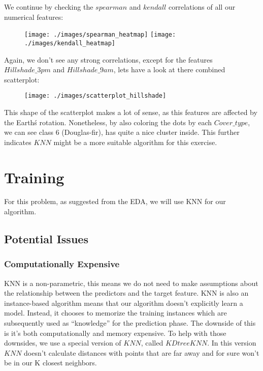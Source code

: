 \documentclass[11pt]{article}
\begin{document}
    We continue by checking the $spearman$ and $kendall$ correlations of all our numerical features:
    \begin{figure}[H]
        \texttt{[image: ./images/spearman\_heatmap]}
        \texttt{[image: ./images/kendall\_heatmap]}
    \end{figure}

    Again, we don't see any strong correlations, except for the features $Hillshade\_3pm$ and $Hillshade\_9am$, lets have a look at there combined scatterplot:
    \begin{figure}[H]
        \centering
        \texttt{[image: ./images/scatterplot\_hillshade]}
    \end{figure}

    This shape of the scatterplot makes a lot of sense, as this features are affected by the Earth\'s rotation.
    Nonetheless, by also coloring the dots by each $Cover\_type$, we can see class 6 (Douglas-fir), has quite a nice cluster inside. This further indicates $KNN$ might be a more suitable algorithm for this exercise.

    \newpage
    \section*{Training}
    For this problem, as suggested from the EDA, we will use KNN for our algorithm.

    \subsection*{Potential Issues}

    \subsubsection*{Computationally Expensive}
    KNN is a non-parametric, this means we do not need to make assumptions about the relationship between the predictors and the target feature.
    KNN is also an instance-based algorithm means that our algorithm doesn’t explicitly learn a model.
    Instead, it chooses to memorize the training instances which are subsequently used as “knowledge” for the prediction phase.
    The downside of this is it's both computationally and memory expensive.
    To help with those downsides, we use a special version of $KNN$, called $KD tree KNN$.
    In this version $KNN$ doesn't calculate distances with points that are far away and for sure won't be in our K closest neighbors.
\end{document}
